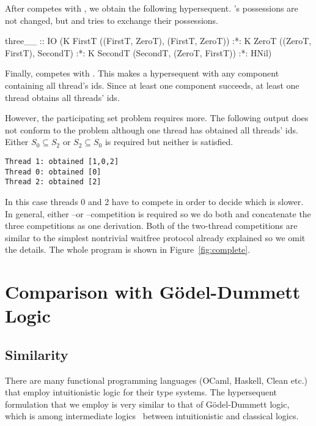 After \verb@SecondT@ competes with \verb@ZeroT@, we obtain the following
hypersequent.  \verb@FirstT@'s possessions are not changed, but \verb@ZeroT@ and
\verb@SecondT@ tries to exchange their possessions.
\begin{spec}
three__ :: IO
  (K FirstT ((FirstT, ZeroT), (FirstT, ZeroT)) :*:
   K ZeroT ((ZeroT, FirstT), SecondT) :*:
   K SecondT (SecondT, (ZeroT, FirstT)) :*: HNil)
\end{spec}
Finally, \verb@SecondT@ competes with \verb@FirstT@.  This makes a hypersequent with
any component containing all thread's ids.  Since at least one component succeeds,
at least one thread obtains all threads' ids.

However, the participating set problem requires more.  The following
output does not conform to the problem although one thread has obtained
all threads' ids.  Either $S_0 \subseteq S_2$ or $S_2\subseteq S_0$ is
required but neither is satisfied.
\begin{verbatim}
Thread 1: obtained [1,0,2]
Thread 0: obtained [0]
Thread 2: obtained [2]
\end{verbatim}
In this case threads 0 and 2 have to compete in order to decide which
is slower.  In general, either \verb@ZeroT@--\verb@SecondT@ or
\verb@FirstT@--\verb@SecondT@ competition is required so we do both and
concatenate the three competitions as one derivation.
Both of the two-thread competitions are similar to the simplest nontrivial
waitfree protocol already explained so we omit the details.  The whole
program is shown in Figure~\ref{fig:complete}.


\section{Comparison with G\"odel-Dummett Logic}


\subsection{Similarity}

There are many functional programming languages (OCaml, Haskell, Clean
etc.) that employ intuitionistic logic for their type systems.
The hypersequent formulation that we employ is very similar to that of
G\"odel-Dummett logic, which is among
intermediate logics~\citep{umezawa} between intuitionistic and
classical logics.

